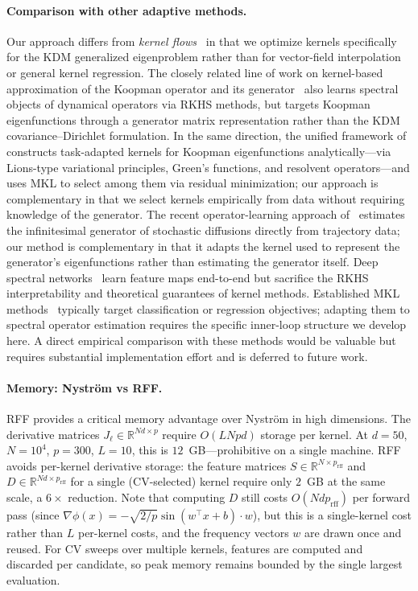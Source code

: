 \documentclass[11pt]{article}
\theoremstyle{remark}
\begin{document}
\paragraph{Comparison with other adaptive methods.}
Our approach differs from \emph{kernel flows}~\citep{owhadi2019kernel,hamzi2021learning} in that we optimize kernels specifically for the KDM generalized eigenproblem rather than for vector-field interpolation or general kernel regression.
The closely related line of work on kernel-based approximation of the Koopman operator and its generator~\citep{klus2020kernel,lee2024kernel} also learns spectral objects of dynamical operators via RKHS methods, but targets Koopman eigenfunctions through a generator matrix representation rather than the KDM covariance--Dirichlet formulation.
In the same direction, the unified framework of~\citet{hamzi2025transport,hamzi2025stochastic} constructs task-adapted kernels for Koopman eigenfunctions analytically---via Lions-type variational principles, Green's functions, and resolvent operators---and uses MKL to select among them via residual minimization; our approach is complementary in that we select kernels empirically from data without requiring knowledge of the generator.
The recent operator-learning approach of~\citet{NEURIPS2024_f930c6e1} estimates the infinitesimal generator of stochastic diffusions directly from trajectory data; our method is complementary in that it adapts the kernel used to represent the generator's eigenfunctions rather than estimating the generator itself.
Deep spectral networks~\citep{pmlr-v238-cabannes24a} learn feature maps end-to-end but sacrifice the RKHS interpretability and theoretical guarantees of kernel methods.
Established MKL methods~\citep{gonen2011multiple} typically target classification or regression objectives; adapting them to spectral operator estimation requires the specific inner-loop structure we develop here.
A direct empirical comparison with these methods would be valuable but requires substantial implementation effort and is deferred to future work.

\paragraph{Memory: Nystr\"om vs RFF.}
RFF provides a critical memory advantage over Nystr\"om in high dimensions.
The derivative matrices $J_\ell\in\mathbb{R}^{Nd\times p}$ require $O(LNpd)$ storage per kernel.
At $d=50$, $N=10^4$, $p=300$, $L=10$, this is $12$~GB---prohibitive on a single machine.
RFF avoids per-kernel derivative storage: the feature matrices $S\in\mathbb{R}^{N\times p_{\mathrm{rff}}}$ and $D\in\mathbb{R}^{Nd\times p_{\mathrm{rff}}}$ for a single (CV-selected) kernel require only $2$~GB at the same scale, a $6\times$ reduction.
Note that computing $D$ still costs $O(Ndp_{\mathrm{rff}})$ per forward pass (since $\nabla\phi(x)=-\sqrt{2/p}\sin(w^\top x+b)\cdot w$), but this is a single-kernel cost rather than $L$ per-kernel costs, and the frequency vectors $w$ are drawn once and reused.
For CV sweeps over multiple kernels, features are computed and discarded per candidate, so peak memory remains bounded by the single largest evaluation.
\end{document}
